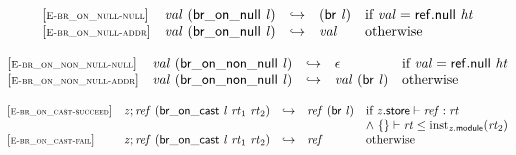 \vspace{1ex}

$$
\begin{array}{@{}l@{}lcl@{}l@{}}
{[\textsc{\scriptsize E{-}br\_on\_null{-}null}]} \quad & {\mathit{val}}~(\mathsf{br\_on\_null}~{\mathit{l}}) &\hookrightarrow& (\mathsf{br}~{\mathit{l}}) &\quad
  \mbox{if}~{\mathit{val}} = \mathsf{ref.null}~{\mathit{ht}} \\
{[\textsc{\scriptsize E{-}br\_on\_null{-}addr}]} \quad & {\mathit{val}}~(\mathsf{br\_on\_null}~{\mathit{l}}) &\hookrightarrow& {\mathit{val}} &\quad
  \mbox{otherwise} \\
\end{array}
$$

\vspace{1ex}

$$
\begin{array}{@{}l@{}lcl@{}l@{}}
{[\textsc{\scriptsize E{-}br\_on\_non\_null{-}null}]} \quad & {\mathit{val}}~(\mathsf{br\_on\_non\_null}~{\mathit{l}}) &\hookrightarrow& \epsilon &\quad
  \mbox{if}~{\mathit{val}} = \mathsf{ref.null}~{\mathit{ht}} \\
{[\textsc{\scriptsize E{-}br\_on\_non\_null{-}addr}]} \quad & {\mathit{val}}~(\mathsf{br\_on\_non\_null}~{\mathit{l}}) &\hookrightarrow& {\mathit{val}}~(\mathsf{br}~{\mathit{l}}) &\quad
  \mbox{otherwise} \\
\end{array}
$$

\vspace{1ex}

$$
\begin{array}{@{}l@{}lcl@{}l@{}}
{[\textsc{\scriptsize E{-}br\_on\_cast{-}succeed}]} \quad & {\mathit{z}} ; {\mathit{ref}}~(\mathsf{br\_on\_cast}~{\mathit{l}}~{\mathit{rt}}_{{1}}~{\mathit{rt}}_{{2}}) &\hookrightarrow& {\mathit{ref}}~(\mathsf{br}~{\mathit{l}}) &\quad
  \mbox{if}~{\mathit{z}}.\mathsf{store} \vdash {\mathit{ref}} : {\mathit{rt}} \\
 &&&&\quad {\land}~\{ \begin{array}[t]{@{}l@{}}
 \}\end{array} \vdash {\mathit{rt}} \leq {{\mathrm{inst}}}_{{\mathit{z}}.\mathsf{module}}({\mathit{rt}}_{{2}}) \\
{[\textsc{\scriptsize E{-}br\_on\_cast{-}fail}]} \quad & {\mathit{z}} ; {\mathit{ref}}~(\mathsf{br\_on\_cast}~{\mathit{l}}~{\mathit{rt}}_{{1}}~{\mathit{rt}}_{{2}}) &\hookrightarrow& {\mathit{ref}} &\quad
  \mbox{otherwise} \\
\end{array}
$$


